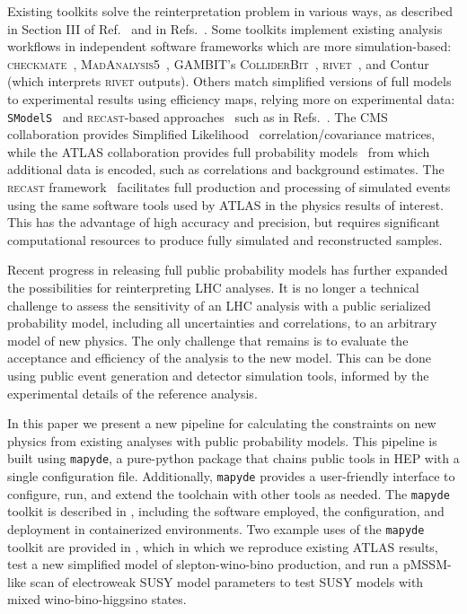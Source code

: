 \documentclass{article}
\newcommand{\mapyde}{\texttt{mapyde}}
\newcommand{\recast}{\textsc{recast}}
\begin{document}
Existing toolkits solve the reinterpretation problem in various ways, as described in Section III of Ref.~\cite{LHCReinterpretationForum:2020xtr} and in Refs.~\cite{Cranmer:2021urp,Bailey:2022tdz}.  Some toolkits implement existing analysis workflows in independent software frameworks which are more simulation-based: \textsc{checkmate}~\cite{Dercks:2016npn}, \textsc{MadAnalysis5}~\cite{Conte:2018vmg,Araz:2020lnp,Dumont:2014tja}, \textsc{GAMBIT}'s \textsc{ColliderBit}~\cite{GAMBIT:2017yxo,Kvellestad:2019vxm,GAMBIT:2018gjo,zenodo:gambit}, \textsc{rivet}~\cite{Bierlich:2019rhm,Bierlich:2020wms}, and Contur~\cite{Buckley:2021neu} (which interprets \textsc{rivet} outputs).  Others match simplified versions of full models to experimental results using efficiency maps, relying more on experimental data: \texttt{SModelS}~\cite{Alguero:2021dig} and \recast-based approaches~\cite{Cranmer:2010hk} such as in Refs.~\cite{zenodo:LHCreinterpretation,llpRepo,RECAST1,RECAST2,RECAST3}.  The CMS collaboration provides Simplified Likelihood~\cite{CMS-NOTE-2017-001} correlation/covariance matrices, while the ATLAS collaboration provides full probability models~\cite{ATL-PHYS-PUB-2019-029} from which additional data is encoded, such as correlations and background estimates. The \recast{} framework~\cite{Cranmer:2010hk} facilitates full production and processing of simulated events using the same software tools used by ATLAS in the physics results of interest.  This has the advantage of high accuracy and precision, but requires significant computational resources to produce fully simulated and reconstructed samples.

Recent progress in releasing full public probability models has further expanded the possibilities for reinterpreting LHC analyses.  It is no longer a technical challenge to assess the sensitivity of an LHC analysis with a public serialized probability model, including all uncertainties and correlations, to an arbitrary model of new physics.  The only challenge that remains is to evaluate the acceptance and efficiency of the analysis to the new model.  This can be done using public event generation and detector simulation tools, informed by the experimental details of the reference analysis.

In this paper we present a new pipeline for calculating the constraints on new physics from existing analyses with public probability models. This pipeline is built using \mapyde, a pure-python package that chains public tools in HEP with a single configuration file. Additionally, \mapyde{} provides a user-friendly interface to configure, run, and extend the toolchain with other tools as needed.  The \mapyde{} toolkit is described in , including the software employed, the configuration, and deployment in containerized environments.  Two example uses of the \mapyde{} toolkit are provided in , which in which we reproduce existing ATLAS results, test a new simplified model of slepton-wino-bino production, and run a pMSSM-like scan of electroweak SUSY model parameters to test SUSY models with mixed wino-bino-higgsino states.
\end{document}
